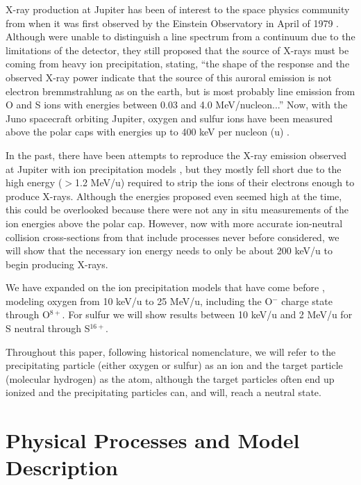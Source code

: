 \documentclass[draft]{agujournal2018}
\begin{document}
X-ray production at Jupiter has been of interest to the space physics community from when it was first observed by the Einstein Observatory in April of 1979 \citep{metzger1983}.
Although \citet{metzger1983} were unable to distinguish a line spectrum from a continuum due to the limitations of the detector, they still proposed that the source of X-rays must be coming from heavy ion precipitation, stating, ``the shape of the response and the observed X-ray power indicate that the source of this auroral emission is not electron bremmstrahlung as on the earth, but is most probably line emission from O and S ions with energies between 0.03 and 4.0 MeV/nucleon...''
Now, with the Juno spacecraft orbiting Jupiter, oxygen and sulfur ions have been measured above the polar caps with energies up to 400 keV per nucleon (u) \citep{haggerty2017,clark2017a,clark2017b}.

In the past, there have been attempts to reproduce the X-ray emission observed at Jupiter with ion precipitation models \citep{cravens1995,ozak2010,ozak2013}, but they mostly fell short due to the high energy ($>$1.2 MeV/u) required to strip the ions of their electrons enough to produce X-rays.
Although the energies proposed even seemed high at the time, this could be overlooked because there were not any in situ measurements of the ion energies above the polar cap.
However, now with more accurate ion-neutral collision cross-sections from \citet{schultz2018} that include processes never before considered, we will show that the necessary ion energy needs to only be about 200 keV/u to begin producing X-rays.

We have expanded on the ion precipitation models that have come before \citep{cravens1995,ozak2010,ozak2013,houston2018}, modeling oxygen from 10 keV/u to 25 MeV/u, including the O$^-$ charge state through O$^{8+}$.
For sulfur we will show results between 10 keV/u and 2 MeV/u for S neutral through S$^{16+}$.

Throughout this paper, following historical nomenclature, we will refer to the precipitating particle (either oxygen or sulfur) as an ion and the target particle (molecular hydrogen) as the atom, although the target particles often end up ionized and the precipitating particles can, and will, reach a neutral state.

\section{Physical Processes and Model Description}
\end{document}
